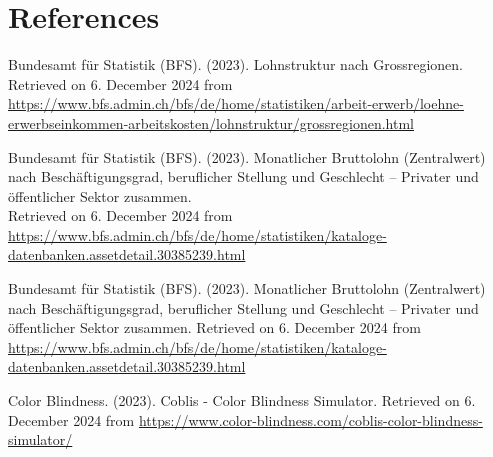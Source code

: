 \documentclass{article}
\begin{document}
\newpage  %
\section{References}


\begin{thebibliography}{9} %

 Bundesamt für Statistik (BFS). (2023). Lohnstruktur nach Grossregionen. \\
Retrieved on 6. December 2024 from  \url{https://www.bfs.admin.ch/bfs/de/home/statistiken/arbeit-erwerb/loehne-erwerbseinkommen-arbeitskosten/lohnstruktur/grossregionen.html}

 Bundesamt für Statistik (BFS). (2023). Monatlicher Bruttolohn (Zentralwert) nach Beschäftigungsgrad, beruflicher Stellung und Geschlecht – Privater und öffentlicher Sektor zusammen. \\
Retrieved on 6. December 2024 from \url{https://www.bfs.admin.ch/bfs/de/home/statistiken/kataloge-datenbanken.assetdetail.30385239.html}

Bundesamt für Statistik (BFS). (2023). Monatlicher Bruttolohn (Zentralwert) nach Beschäftigungsgrad, beruflicher Stellung und Geschlecht – Privater und öffentlicher Sektor zusammen. Retrieved on 6. December 2024 from
\url{https://www.bfs.admin.ch/bfs/de/home/statistiken/kataloge-datenbanken.assetdetail.30385239.html}

 Color Blindness. (2023). Coblis - Color Blindness Simulator. Retrieved on 6. December 2024 from \url{https://www.color-blindness.com/coblis-color-blindness-simulator/}

\end{thebibliography}
\end{document}
